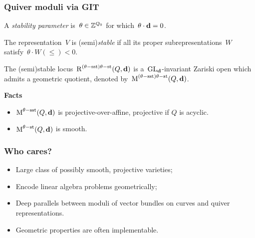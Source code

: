 \documentclass{beamer}
\begin{document}
\begin{frame}
    \frametitle{Quiver moduli via GIT}
A \emph{stability parameter} is~$\theta \in \mathbb{Z}^{Q_0}$
for which~$\theta \cdot \mathbf{d} = 0$. \pause
\begin{definition}
The representation~$V$ is (semi)\emph{stable}
if all its proper subrepresentations~$W$ satisfy~$\theta \cdot W (\leq)< 0$.
\end{definition} \pause
\begin{theorem}
The (semi)stable locus~$\operatorname{R}^{(\theta-\mathrm{sst})\theta-\mathrm{st}}(Q, \mathbf{d})$
is a~$\operatorname{GL}_{\mathbf{d}}$-invariant Zariski open which admits a geometric quotient,
denoted by~$\operatorname{M}^{(\theta-\mathrm{sst})\theta-\mathrm{st}}(Q, \mathbf{d})$.
\end{theorem} \pause

\textbf{Facts} \pause

\begin{itemize}
    \item $\operatorname{M}^{\theta-\mathrm{sst}}(Q, \mathbf{d})$ is projective-over-affine,
    projective if $Q$ is acyclic.
    \item $\operatorname{M}^{\theta-\mathrm{st}}(Q, \mathbf{d})$ is smooth.
\end{itemize}
\end{frame}

\begin{frame}
    \frametitle{Who cares?}
\begin{itemize}
    \item Large class of possibly smooth, projective varieties; \pause
    \item Encode linear algebra problems geometrically; \pause
    \item Deep parallels between moduli of vector bundles on curves
        and quiver representations. \pause
    \item Geometric properties are often implementable.
\end{itemize}

    

\end{frame}
\end{document}
